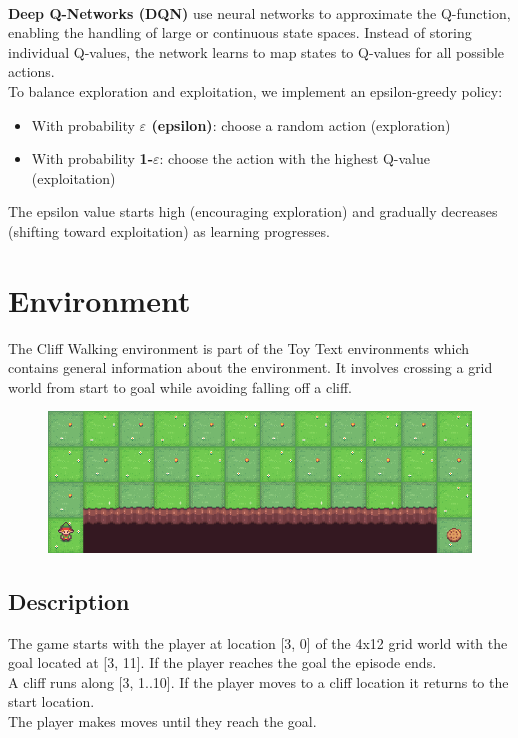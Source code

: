 \documentclass[a4paper,12pt]{article}
\begin{document}
\vspace{0,5cm}\\
\textbf{Deep Q-Networks (DQN)} use neural networks to approximate the Q-function, enabling the handling of large or continuous state spaces. Instead of storing individual Q-values, the network learns to map states to Q-values for all possible actions.
\vspace{0,5cm}\\
To balance exploration and exploitation, we implement an epsilon-greedy policy:
\begin{itemize}
    \item With probability \textbf{$\varepsilon$ (epsilon)}: choose a random action (exploration)
    \item With probability \textbf{1-$\varepsilon$}: choose the action with the highest Q-value (exploitation)
\end{itemize}
The epsilon value starts high (encouraging exploration) and gradually decreases (shifting toward exploitation) as learning progresses.
\section{Environment}
The Cliff Walking environment is part of the Toy Text environments which contains general information about the environment. It involves crossing a grid world from start to goal while avoiding falling off a cliff.
\begin{figure}[H]
    \centering
    \includegraphics[scale=0.7]{cliff_walking.png}
\end{figure}
\subsection{Description}
The game starts with the player at location [3, 0] of the 4x12 grid world with the goal located at [3, 11]. If the player reaches the goal the episode ends.
\vspace{0,5cm}\\
A cliff runs along [3, 1..10]. If the player moves to a cliff location it returns to the start location.
\vspace{0,5cm}\\
The player makes moves until they reach the goal.
\end{document}
